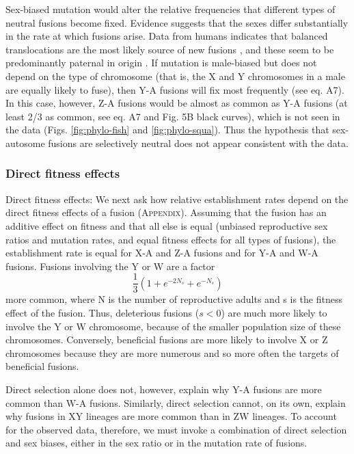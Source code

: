 Sex-biased mutation would alter the relative frequencies that different types of neutral fusions become fixed. Evidence suggests that the sexes differ substantially in the rate at which fusions arise. Data from humans indicates that balanced translocations are the most likely source of new fusions \citep{Schubert2011}, and these seem to be predominantly paternal in origin \citep{Batista1993, Sartorelli2001, Wyroberk2006, Thomas2010, Grossmann2010, Schubert2011}. If mutation is male-biased but does not depend on the type of chromosome (that is, the X and Y chromosomes in a male are equally likely to fuse), then Y-A fusions will fix most frequently (see eq. A7). In this case, however, Z-A fusions would be almost as common as Y-A fusions (at least 2/3 as common, see eq. A7 and Fig. 5B black curves), which is not seen in the data (Figs. \ref{fig:phylo-fish} and \ref{fig:phylo-squa}). Thus the hypothesis that sex-autosome fusions are selectively neutral does not appear consistent with the data.

\subsubsection{Direct fitness effects}

Direct fitness effects: We next ask how relative establishment rates depend on the direct fitness effects of a fusion (\textsc{Appendix}). Assuming that the fusion has an additive effect on fitness and that all else is equal (unbiased reproductive sex ratios and mutation rates, and equal fitness effects for all types of fusions), the establishment rate is equal for X-A and Z-A fusions and for Y-A and W-A fusions. Fusions involving the Y or W are a factor 
\[\frac{1}{3}(1 + e^{-2N_s} + e^{-N_s})\]
more common, where N is the number of reproductive adults and s is the fitness effect of the fusion. Thus, deleterious fusions ($s<\text{0}$) are much more likely to involve the Y or W chromosome, because of the smaller population size of these chromosomes. Conversely, beneficial fusions are more likely to involve X or Z chromosomes because they are more numerous and so more often the targets of beneficial fusions. 

Direct selection alone does not, however, explain why Y-A fusions are more common than W-A fusions. Similarly, direct selection cannot, on its own, explain why fusions in XY lineages are more common than in ZW lineages. To account for the observed data, therefore, we must invoke a combination of direct selection and sex biases, either in the sex ratio or in the mutation rate of fusions. 


